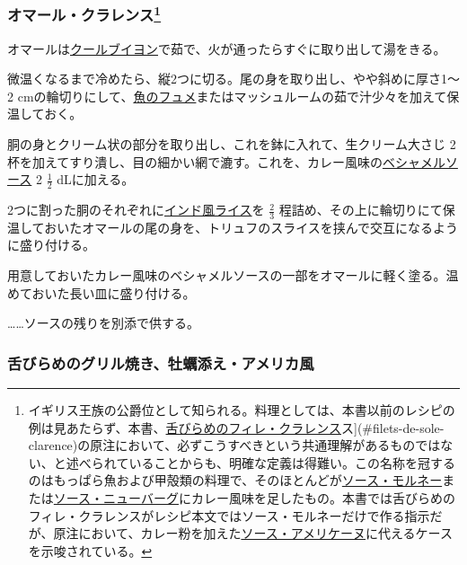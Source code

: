 \hypertarget{homard-clarence}{%
\subsubsection[オマール・クラレンス]{\texorpdfstring{オマール・クラレンス\footnote{イギリス王族の公爵位として知られる。料理としては、本書以前のレシピの例は見あたらず、本書、\protect\hyperlink{filets-de-sole-clarence}{舌びらめのフィレ・クラレンス}ス{]}(\#filets-de-sole-clarence)の原注において、必ずこうすべきという共通理解があるものではない、と述べられていることからも、明確な定義は得難い。この名称を冠するのはもっぱら魚および甲殻類の料理で、そのほとんどが\protect\hyperlink{sauce-mornay}{ソース・モルネー}または\protect\hyperlink{sauce-new-burg}{ソース・ニューバーグ}にカレー風味を足したもの。本書では舌びらめのフィレ・クラレンスがレシピ本文ではソース・モルネーだけで作る指示だが、原注において、カレー粉を加えた\protect\hyperlink{sauce-americaine}{ソース・アメリケーヌ}に代えるケースを示唆されている。}}{オマール・クラレンス}}\label{homard-clarence}}


オマールは\protect\hyperlink{cout-bouillon-e}{クールブイヨン}で茹で、火が通ったらすぐに取り出して湯をきる。

微温くなるまで冷めたら、縦2つに切る。尾の身を取り出し、やや斜めに厚さ1〜
2
cmの輪切りにして、\protect\hyperlink{fumet-de-poisson}{魚のフュメ}またはマッシュルームの茹で汁少々を加えて保温しておく。

胴の身とクリーム状の部分を取り出し、これを鉢に入れて、生クリーム大さじ
2杯を加えてすり潰し、目の細かい網で漉す。これを、カレー風味の\protect\hyperlink{sauce-bechamel}{ベシャメルソース}
2 \(\frac{1}{2}\) dLに加える。

2つに割った胴のそれぞれに\protect\hyperlink{riz-a-l-indienne}{インド風ライス}を
\(\frac{2}{3}\)
程詰め、その上に輪切りにて保温しておいたオマールの尾の身を、トリュフのスライスを挟んで交互になるように盛り付ける。

用意しておいたカレー風味のベシャメルソースの一部をオマールに軽く塗る。温めておいた長い皿に盛り付ける。

\ldots{}\ldots{}ソースの残りを別添で供する。

\hypertarget{sole-grillee-aux-huuxeetres-a-l-americaine}{%
\subsubsection{舌びらめのグリル焼き、牡蠣添え・アメリカ風}\label{sole-grillee-aux-huuxeetres-a-l-americaine}}

